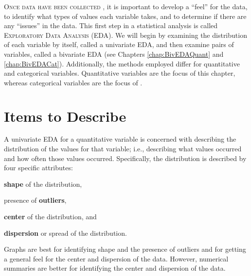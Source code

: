 \documentclass[10pt,openany]{book}\usepackage[]{graphicx}\usepackage[]{color}
\begin{document}
\minitoc
\newpage

\lettrine{O}{nce data have been collected} , it is important to develop a ``feel'' for the data, to identify what types of values each variable takes, and to determine if there are any ``issues'' in the data.  This first step in a statistical analysis is called \textsc{Exploratory Data Analysis} (EDA).  We will begin by examining the distribution of each variable by itself, called a univariate EDA, and then examine pairs of variables, called a bivariate EDA (see Chapters \ref{chap:BivEDAQuant} and \ref{chap:BivEDACat}). Additionally, the methods employed differ for quantitative and categorical variables. Quantitative variables are the focus of this chapter, whereas categorical variables are the focus of .

\vspace{-6pt}
\section{Items to Describe}
\vspace{-12pt}
A univariate EDA for a quantitative variable is concerned with describing the distribution of the values for that variable; i.e., describing what values occurred and how often those values occurred.  Specifically, the distribution is described by four specific attributes:

\vspace{-12pt}
\begin{Enumerate}
  \item \textbf{shape} of the distribution,
  \item presence of \textbf{outliers},
  \item \textbf{center} of the distribution, and
  \item \textbf{dispersion} or spread of the distribution.
\end{Enumerate}
\vspace{-8pt}

Graphs are best for identifying shape and the presence of outliers and for getting a general feel for the center and dispersion of the data.  However, numerical summaries are better for identifying the center and dispersion of the data.

\vspace{-6pt}

\vspace{-12pt}
\end{document}
